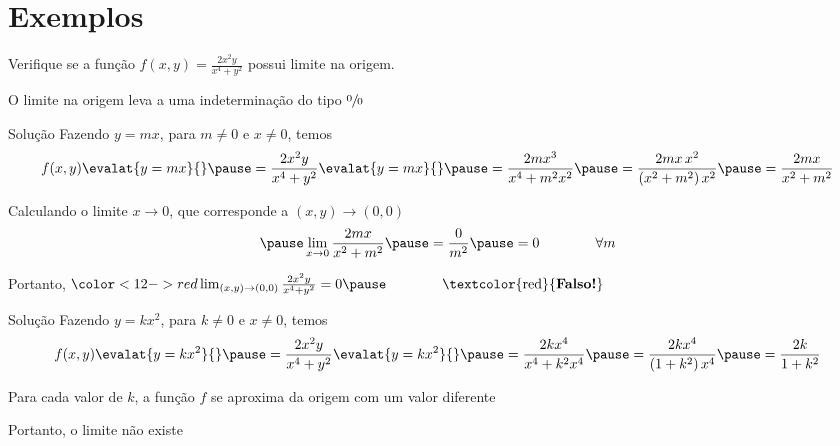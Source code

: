 \section{Exemplos}

\begin{question}
  Verifique se a função
  \(
  f(x, y) = \frac{2x^2y}{x^4+y^2}
  \)
  possui limite na origem.

  \pause
  \vspace{\baselineskip}
  O limite na origem leva a uma indeterminação do tipo $\sfrac{0}{0}$
\end{question}

\begin{resolution}{Solução}
  Fazendo \(y=mx\), para \(m\neq 0\) e \(x\neq 0\),
  \pause
  temos
  \[
    f(x, y)\evalat{y=mx}{}
    \pause
    = \frac{2x^2y}{x^4+y^2} \evalat{y=mx}{}
    \pause
    = \frac{2mx^3}{x^4+m^2x^2}
    \pause
    = \frac{2mx\,x^2}{\left(x^2+m^2\right)x^2}
    \pause
    = \frac{2mx}{x^2+m^2}
  \]

  \pause
  Calculando o limite \(x\to 0\), que corresponde a \((x, y)\to (0, 0)\)
  \[
    \pause
    \lim_{x\to 0} \frac{2mx}{x^2+m^2}
    \pause
    = \frac{0}{m^2}
    \pause
    = 0
    \qquad\qquad
    \forall m
  \]

  \pause
  Portanto,
  \(
    {
      \color<12->{red}
      \lim_{(x, y)\to(0, 0)} \frac{2x^2y}{x^4+y^2} = 0
    }
    \pause
    \qquad
    \qquad
    \text{\textcolor{red}{\textbf{Falso!}}}
  \)
\end{resolution}

\begin{resolution}{Solução}
  Fazendo \(y=kx^2\), para \(k\neq 0\) e \(x\neq 0\),
  \pause
  temos
  \[
  f(x, y)\evalat{y=kx^2}{}
  \pause
  = \frac{2x^2y}{x^4+y^2} \evalat{y=kx^2}{}
  \pause
  = \frac{2kx^4}{x^4+k^2x^4}
  \pause
  = \frac{2kx^4}{\left(1+k^2\right)x^4}
  \pause
  = \frac{2k}{1+k^2}
  \]

  \pause
  Para cada valor de $k$, a função $f$ se aproxima da origem com um valor diferente

  \pause
  Portanto, o limite não existe
\end{resolution}

